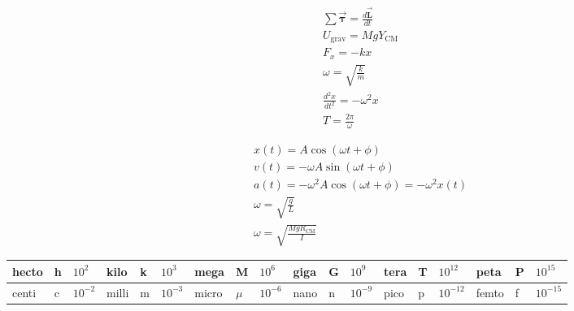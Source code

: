 \documentclass[9pt,letterpaper]{article}
\newcommand{\vect}[1]{\vec{\boldsymbol{#1}}}
\begin{document}
\begin{minipage}[t]{0.3\linewidth}
\begin{align*}
&\sum \vect{\tau}=\frac{d\vect{L}}{dt}\\
&U_{\text{grav}} = Mg{Y}_{\text{CM}}\\
    &F_{x} = -kx\\
    &\omega = \sqrt{\frac{k}{m}}\\
    &\frac{d^{2}x}{dt^{2}} = -\omega^{2}x\\
    &T = \frac{2\pi}{\omega}
\end{align*}
\end{minipage}
\hspace{-0.2in}\begin{minipage}[t]{0.3\linewidth}
\begin{align*}
    &x(t) = A \cos{(\omega t + \phi)}\\
    &v(t) = -\omega A \sin{(\omega t + \phi)}\\
    &a(t) = -\omega^{2} A \cos{(\omega t + \phi)} = -\omega^{2}x(t)\\
    &\omega = \sqrt{\frac{g}{L}}\\
    &\omega = \sqrt{\frac{MgR_{\text{CM}}}{I}}
\end{align*}
\end{minipage}



\hspace{-0.2in}
\vspace{0.3in}
\begin{center}
\begin{tabular}{|lll|lll|lll|lll|lll|lll|}
    \hline
    hecto & h & $10^{2}$ &kilo & k & $10^{3}$ & mega & M & $10^{6}$ & giga & G & $10^{9}$ & tera & T & $10^{12}$ & peta & P & $10^{15}$ \\
 \hline
    centi & c & $10^{-2}$ & milli & m & $10^{-3}$ & micro & $\mu$ & $10^{-6}$ & nano & n & $10^{-9}$ & pico & p & $10^{-12}$ & femto & f & $10^{-15}$ \\
    \hline
\end{tabular}
\end{center}
\end{document}
